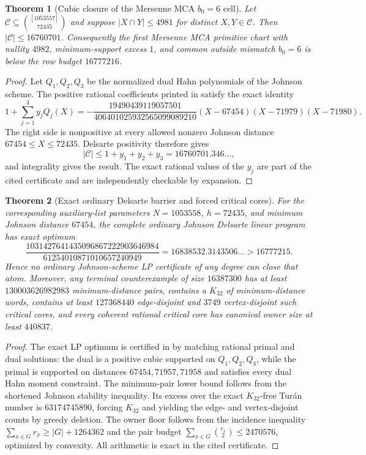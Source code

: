 \documentclass[11pt,a4paper]{amsart}
\numberwithin{equation}{section}
\newtheorem{theorem}{Theorem}[section]
\theoremstyle{remark}
\begin{document}
\begin{theorem}[Cubic closure of the Mersenne MCA $b_0=6$ cell]\label{thm:cubic-mersenne}
Let $\mathcal C\subseteq\binom{[1053557]}{72435}$ and suppose $|X\cap Y|\le4981$ for distinct $X,Y\in\mathcal C$.  Then $|\mathcal C|\le16760701$.  Consequently the first Mersenne MCA primitive chart with nullity $4982$, minimum-support excess $1$, and common outside mismatch $b_0=6$ is below the row budget $16777216$.
\end{theorem}

\begin{proof}
Let $Q_1,Q_2,Q_3$ be the normalized dual Hahn polynomials of the Johnson scheme.  The positive rational coefficients printed in \cite[Theorem ``Cubic closure of the Mersenne MCA $b_0=6$ atom'']{ChoComp26} satisfy the exact identity
\[
 1+\sum_{j=1}^3y_jQ_j(X)=
 -\frac{19490439119057501}{406401025932565099089210}
 (X-67454)(X-71979)(X-71980).
\]
The right side is nonpositive at every allowed nonzero Johnson distance $67454\le X\le72435$.  Delsarte positivity therefore gives
\[
 |\mathcal C|\le1+y_1+y_2+y_3
 =16760701.346\ldots,
\]
and integrality gives the result.  The exact rational values of the $y_j$ are part of the cited certificate and are independently checkable by expansion.
\end{proof}

\begin{theorem}[Exact ordinary Delsarte barrier and forced critical cores]\label{thm:delsarte-barrier}
For the corresponding auxiliary-list parameters $N=1053558$, $h=72435$, and minimum Johnson distance $67454$, the complete ordinary Johnson Delsarte linear program has exact optimum
\[
 \frac{1031427641435096867222903646984}{61254010871010657240949}
 =16838532.3143506\ldots>16777215.
\]
Hence no ordinary Johnson-scheme LP certificate of any degree can close that atom.  Moreover, any terminal counterexample of size $16387300$ has at least $130003626982983$ minimum-distance pairs, contains a $K_{32}$ of minimum-distance words, contains at least $127368440$ edge-disjoint and $3749$ vertex-disjoint such critical cores, and every coherent rational critical core has canonical owner size at least $440837$.
\end{theorem}

\begin{proof}
The exact LP optimum is certified in \cite[Theorem ``Exact full Delsarte optimum for the Mersenne auxiliary-list atom'']{ChoComp26} by matching rational primal and dual solutions: the dual is a positive cubic supported on $Q_1,Q_2,Q_3$, while the primal is supported on distances $67454,71957,71958$ and satisfies every dual Hahn moment constraint.  The minimum-pair lower bound follows from the shortened Johnson stability inequality.  Its excess over the exact $K_{32}$-free Tur\'an number is $63174745890$, forcing $K_{32}$ and yielding the edge- and vertex-disjoint counts by greedy deletion.  The owner floor follows from the incidence inequality $\sum_{x\in G}r_x\ge |G|+1264362$ and the pair budget $\sum_{x\in G}\binom{r_x}{2}\le2470576$, optimized by convexity.  All arithmetic is exact in the cited certificate.
\end{proof}
\end{document}
